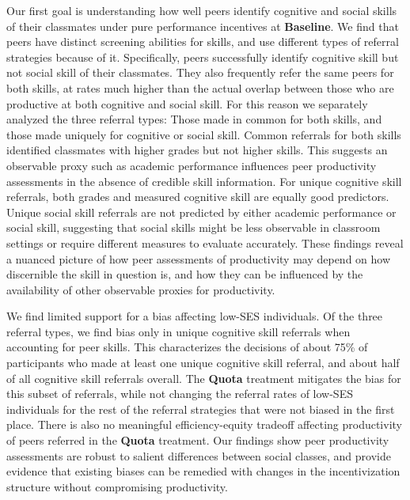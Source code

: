 \documentclass[11pt,a4paper,oneside]{article}
\begin{document}
Our first goal is understanding how well peers identify cognitive and social skills of their classmates under pure performance incentives at \textbf{Baseline}. We find that peers have distinct screening abilities for skills, and use different types of referral strategies because of it. Specifically, peers successfully identify cognitive skill but not social skill of their classmates. They also frequently refer the same peers for both skills, at rates much higher than the actual overlap between those who are productive at both cognitive and social skill. For this reason we separately analyzed the three referral types: Those made in common for both skills, and those made uniquely for cognitive or social skill. Common referrals for both skills identified classmates with higher grades but not higher skills. This suggests an observable proxy such as academic performance influences peer productivity assessments in the absence of credible skill information. For unique cognitive skill referrals, both grades and measured cognitive skill are equally good predictors. Unique social skill referrals are not predicted by either academic performance or social skill, suggesting that social skills might be less observable in classroom settings or require different measures to evaluate accurately. These findings reveal a nuanced picture of how peer assessments of productivity may depend on how discernible the skill in question is, and how they can be influenced by the availability of other observable proxies for productivity.

We find limited support for a bias affecting low-SES individuals. Of the three referral types, we find bias only in unique cognitive skill referrals when accounting for peer skills. This characterizes the decisions of about 75\% of participants who made at least one unique cognitive skill referral, and about half of all cognitive skill referrals overall. The \textbf{Quota} treatment mitigates the bias for this subset of referrals, while not changing the referral rates of low-SES individuals for the rest of the referral strategies that were not biased in the first place. There is also no meaningful efficiency-equity tradeoff affecting productivity of peers referred in the \textbf{Quota} treatment. Our findings show peer productivity assessments are robust to salient differences between social classes, and provide evidence that existing biases can be remedied with changes in the incentivization structure without compromising productivity.   
\end{document}
